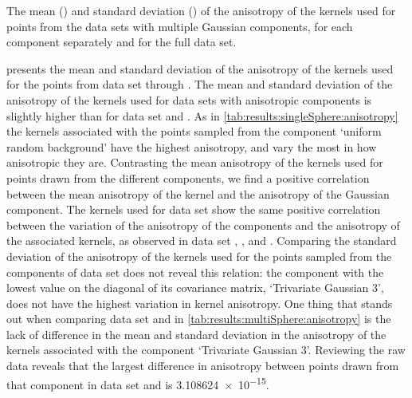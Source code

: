 	\begin{table*}
		\centering
		
		\caption{The mean (\mean) and standard deviation (\SD) of the anisotropy of the kernels used for points from the data sets with multiple Gaussian components, for each component separately and for the full data set.} 	
		\label{tab:results:multiSphere:anisotropy}
	\end{table*}
	 presents the mean and standard deviation of the anisotropy of the kernels used for the points from data set \ferdosiTwo through \baakmanThree.
	The mean and standard deviation of the anisotropy of the kernels used for data sets with anisotropic components is slightly higher than for data set \ferdosiTwo and \ferdosiThree.
	As in \cref{tab:results:singleSphere:anisotropy} the kernels associated with the points sampled from the component `uniform random background' have the highest anisotropy, and vary the most in how anisotropic they are. 
	Contrasting the mean anisotropy of the kernels used for points drawn from the different components, we find a positive correlation between the mean anisotropy of the kernel and the anisotropy of the Gaussian component. 
		The kernels used for data set \baakmanTwo show the same positive correlation between the variation of the anisotropy of the components and the anisotropy of the associated kernels, as observed in data set \baakmanOne, \baakmanFour, and \baakmanFive. 
		Comparing the standard deviation of the anisotropy of the kernels used for the points sampled from the components of data set \baakmanThree does not reveal this relation: the component with the lowest value on the diagonal of its covariance matrix, `Trivariate Gaussian 3', does not have the highest variation in kernel anisotropy. 
	One thing that stands out when comparing data set \ferdosiThree and \baakmanThree in \cref{tab:results:multiSphere:anisotropy} is the lack of difference in the mean and standard deviation in the anisotropy of the kernels associated with the component `Trivariate Gaussian 3'. Reviewing the raw data reveals that the largest difference in anisotropy between points drawn from that component in data set \ferdosiThree and \baakmanThree is \num{3.108624e-15}.

